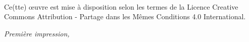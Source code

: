 \newpage
\begin{fullwidth}
~\vfill
\thispagestyle{empty}
\setlength{\parindent}{0pt}
\setlength{\parskip}{\baselineskip}

\par{}

\par Ce(tte) œuvre est mise à disposition selon les termes de la Licence Creative Commons Attribution - Partage dans les Mêmes Conditions 4.0 International.

\par\textit{Première impression, \monthyear}
\end{fullwidth}